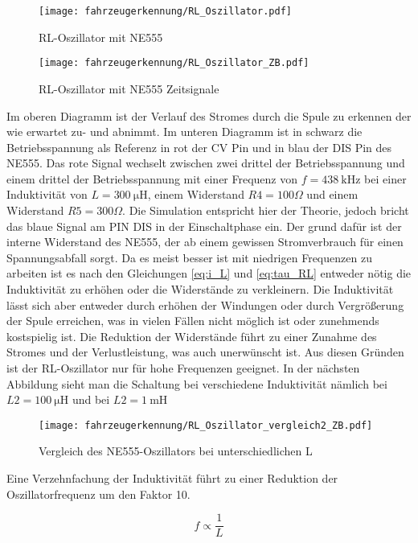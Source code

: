 \begin{figure}[H]
    \centering
    \texttt{[image: fahrzeugerkennung/RL\_Oszillator.pdf]}
    \caption{RL-Oszillator mit NE555}
\end{figure}

\begin{figure}[H]
    \centering
    \texttt{[image: fahrzeugerkennung/RL\_Oszillator\_ZB.pdf]}
    \caption{RL-Oszillator mit NE555 Zeitsignale}
\end{figure}

Im oberen Diagramm ist der Verlauf des Stromes durch die Spule zu erkennen der wie erwartet zu- und abnimmt. Im unteren Diagramm ist in 
schwarz die Betriebsspannung als Referenz in rot der CV Pin und in blau der DIS Pin des NE555. Das rote Signal wechselt zwischen zwei drittel der Betriebsspannung 
und einem drittel der Betriebsspannung mit einer Frequenz von $f = \SI{438}{\kilo\hertz}$ bei einer Induktivität von $L = \SI{300}{\micro\henry}$, einem Widerstand $R4 = 100\Omega$ und einem
Widerstand $R5 = 300\Omega$. Die Simulation entspricht hier der Theorie, jedoch bricht das blaue Signal am PIN DIS in der Einschaltphase ein.
Der grund dafür ist der interne Widerstand des NE555, der ab einem gewissen Stromverbrauch für einen Spannungsabfall sorgt. Da es meist besser ist mit
niedrigen Frequenzen zu arbeiten ist es nach den Gleichungen \ref{eq:i_L} und \ref{eq:tau_RL} entweder nötig die Induktivität zu erhöhen oder die Widerstände zu verkleinern.
Die Induktivität lässt sich aber entweder durch erhöhen der Windungen oder durch Vergrößerung der Spule erreichen, was in vielen Fällen nicht möglich ist oder zunehmends kostspielig ist.
Die Reduktion der Widerstände führt zu einer Zunahme des Stromes und der Verlustleistung, was auch unerwünscht ist.
Aus diesen Gründen ist der RL-Oszillator nur für hohe Frequenzen geeignet. In der nächsten Abbildung sieht man die Schaltung bei verschiedene Induktivität
nämlich bei $L2 = \SI{100}{\micro\henry}$ und bei $L2 = \SI{1}{\milli\henry}$

\begin{figure}[H]
    \centering
    \texttt{[image: fahrzeugerkennung/RL\_Oszillator\_vergleich2\_ZB.pdf]}
    \caption{Vergleich des NE555-Oszillators bei unterschiedlichen L}
\end{figure}

Eine Verzehnfachung der Induktivität führt zu einer Reduktion der Oszillatorfrequenz um den Faktor 10.

\begin{equation} \label{iq:f_NE555}
    f \propto \frac{1}{L}
\end{equation} 

